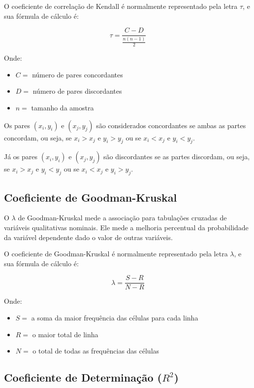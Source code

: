 \documentclass[
  portuguese,
]{estat/estat}
\providecommand{\tightlist}{%
  \setlength{\itemsep}{0pt}\setlength{\parskip}{0pt}}
\begin{document}
O coeficiente de correlação de Kendall é normalmente representado pela
letra \(\tau\), e sua fórmula de cálculo é:

\[
\tau = \frac{C-D}{\frac{n(n-1)}{2}}
\]

Onde:

\begin{itemize}
\tightlist
\item
  \(C =\) número de pares concordantes
\item
  \(D =\) número de pares discordantes
\item
  \(n =\) tamanho da amostra
\end{itemize}

Os pares \((x_i,y_i)\) e \((x_j,y_j)\) são considerados concordantes se
ambas as partes concordam, ou seja, se \(x_i>x_j\) e \(y_i>y_j\) ou se
\(x_i<x_j\) e \(y_i<y_j\).

Já os pares \((x_i,y_i)\) e \((x_j,y_j)\) são discordantes se as partes
discordam, ou seja, se \(x_i>x_j\) e \(y_i<y_j\) ou se \(x_i<x_j\) e
\(y_i>y_j\).

\subsection{Coeficiente de
Goodman-Kruskal}\label{coeficiente-de-goodman-kruskal}

O \(\lambda\) de Goodman-Kruskal mede a associação para tabulações
cruzadas de variáveis qualitativas nominais. Ele mede a melhoria
percentual da probabilidade da variável dependente dado o valor de
outras variáveis.

O coeficiente de Goodman-Kruskal é normalmente representado pela letra
\(\lambda\), e sua fórmula de cálculo é:

\[
\lambda = \frac{S-R}{N-R}
\]

Onde:

\begin{itemize}
\tightlist
\item
  \(S =\) a soma da maior frequência das células para cada linha
\item
  \(R =\) o maior total de linha
\item
  \(N =\) o total de todas as frequências das células
\end{itemize}

\subsection{\texorpdfstring{Coeficiente de Determinação
(\(R^2\))}{Coeficiente de Determinação (R\^{}2)}}\label{coeficiente-de-determinauxe7uxe3o-r2}
\end{document}
